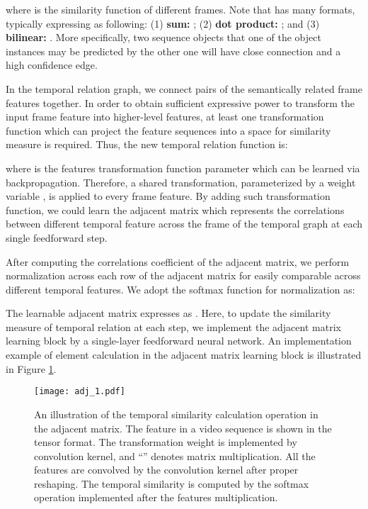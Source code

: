 \documentclass[conference,compsoc]{IEEEtran}
\begin{document}
    where  is the similarity function of different frames. Note that  has many formats, typically expressing as following:
    (1) \textbf{sum:} ;
    (2) \textbf{dot product:} ; and (3) \textbf{bilinear:}
    . More specifically, two sequence objects that one of the object instances may be predicted by the other one will have close connection and a high confidence edge.

    In the temporal relation graph, we connect pairs of the semantically related frame features together. In order to obtain sufficient expressive power to transform the input frame feature into higher-level features, at least one transformation function which can project the feature sequences into a space for similarity measure is required. Thus, the new temporal relation function is:
    
    where  is the features transformation function parameter which can be learned via backpropagation. Therefore, a shared transformation, parameterized by a weight variable , is applied to every frame feature. By adding such transformation function, we could learn the adjacent matrix which represents the correlations between different temporal feature across the frame of the temporal graph at each single feedforward step.

    After computing the correlations coefficient of the adjacent matrix, we perform normalization across each row of the adjacent matrix for easily comparable across different temporal features. We adopt the softmax function for normalization as:
    
    
    The learnable adjacent matrix  expresses as . Here, to update the similarity measure of temporal relation at each step, we implement the adjacent matrix learning block by a single-layer feedforward neural network. An implementation example of element calculation in the adjacent matrix learning block is illustrated in Figure \ref{fig:module1}.
    
\begin{figure}[h]
    \centering
    \texttt{[image: adj\_1.pdf]}
\caption{An illustration of the temporal similarity calculation operation in the adjacent matrix. The feature in a video sequence is shown in the tensor format. The transformation weight is implemented by  convolution kernel, and ``'' denotes matrix multiplication. All the features are convolved by the convolution kernel after proper reshaping. The temporal similarity is computed by the softmax operation implemented after the features multiplication.}
    \label{fig:module1}
\end{figure}
    
\end{document}
